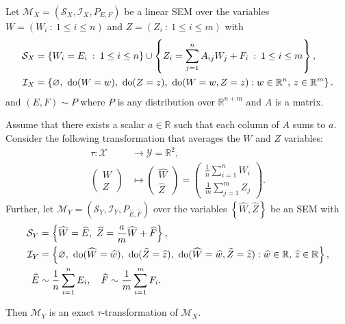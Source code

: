 \medskip

\begin{theorem}\label{theorem:micro-macro}
Let ${\mathcal{M}_X = \left(\mathcal{S}_X, \mathcal{I}_X, P_{E,F} \right)}$ be a linear SEM over the variables ${W=\left( W_i \: : \: 1\leq  i \leq n \right)}$ and ${Z=\left( Z_i \: : \: 1\leq  i \leq m \right)}$ with
%
\begin{align*}
\mathcal{S}_X &= \left\{ W_i = E_i \:  : \: 1 \leq i \leq n  \right\} \cup \left\{ Z_i = \sum_{j=1}^n A_{ij}W_j  + F_{i} \:  : \: 1\leq i \leq m \right\}, \\
%
\mathcal{I}_X &= \left\{ \nulli, \ \doop(W= w), \ \doop(Z= z), \ \doop(W= w, Z= z ) :   w \in \mathbb{R}^{n}, \, z \in \mathbb{R}^m \right\}.
%
\end{align*}
%
and $(E,F)  \sim P$ where $P$ is any distribution over $\mathbb{R}^{n+m}$ and $A$ is a matrix.

Assume that there exists a scalar $a\in \mathbb{R}$ such that each column of $A$ sums to $a$. Consider the following transformation that averages the $W$ and $Z$ variables:
%
\begin{align*}
\tau : \mathcal{X} &\rightarrow \mathcal{Y} = \mathbb{R}^2, \\
\begin{pmatrix} W \\ Z \end{pmatrix} &\mapsto \begin{pmatrix} \widehat{W} \\ \widehat{Z} \end{pmatrix} = \begin{pmatrix} \frac{1}{n}\sum_{i=1}^n W_i \\ \frac{1}{m}\sum_{j=1}^m Z_j  \end{pmatrix}.
\end{align*}
%
Further, let $\mathcal{M}_Y = \left(\mathcal{S}_Y, \mathcal{I}_Y, P_{\widehat{E},\widehat{F}} \right)$ over the variables ${\left\lbrace \widehat{W}, \widehat{Z} \right\rbrace}$ be an SEM with
%
\begin{align*}
\mathcal{S}_Y &= \left\{ \widehat{W} = \widehat{E}, \ \widehat{Z} = \frac{a}{m}\widehat{W} + \widehat{F} \right\}, \\
%
\mathcal{I}_Y &= \left\{ \nulli,\ \doop(\widehat{W}= \widehat{w}), \ \doop(\widehat{Z}= \widehat{z}),\ \doop(\widehat{W}= \widehat{w}, \widehat{Z}= \widehat{z} ) :   \widehat{w} \in \mathbb{R}, \, \widehat{z} \in \mathbb{R} \right\}, \\
%
\widehat{E}  & \sim \frac{1}{n}\sum_{i=1}^{n} E_i, \quad
\widehat{F}  \sim \frac{1}{m}\sum_{i=1}^{m} F_i. 
\end{align*}

Then $\mathcal{M}_Y$ is an exact $\tau$-transformation of $\mathcal{M}_X$.
\end{theorem}



